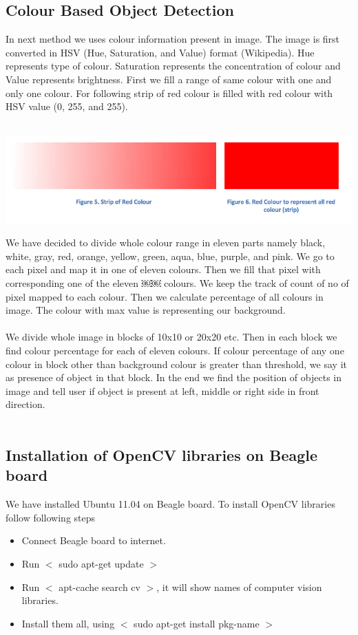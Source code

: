 \documentclass[12pt]{article}
\begin{document}
\subsection{Colour Based Object Detection}
In next method we uses colour information present in image. The image is first converted in HSV (Hue, Saturation, and Value) format (Wikipedia). Hue represents type of colour. Saturation represents the concentration of colour and Value represents brightness. First we fill a range of same colour with one and only one colour. For following strip of red colour is filled with red colour with HSV value (0, 255, and 255)\cite{hslhsv}.\\
\\
\begin{center} \includegraphics[scale=0.4]{a3} \end{center}
We have decided to divide whole colour range in eleven parts namely black, white, gray, red, orange, yellow, green, aqua, blue, purple, and pink. We go to each pixel and map it in one of eleven colours. Then we fill that pixel with corresponding one of the eleven
￼￼
colours. We keep the track of count of no of pixel mapped to each colour. Then we calculate percentage of all colours in image. The colour with max value is representing our background.\\
\\
We divide whole image in blocks of 10x10 or 20x20 etc. Then in each block we find colour percentage for each of eleven colours. If colour percentage of any one colour in block other than background colour is greater than threshold, we say it as presence of object in that block. In the end we find the position of objects in image and tell user if object is present at left, middle or right side in front direction.\\
\\
\subsection{Installation of OpenCV libraries on Beagle board}
We have installed Ubuntu 11.04 on Beagle board. To install OpenCV\cite{opencv} libraries follow following steps
\begin{itemize}
\item Connect Beagle board to internet.
\item Run $<$ sudo apt-get update $>$
\item Run $<$ apt-cache search cv $>$, it will show names of computer vision libraries.
\item Install them all, using $<$ sudo apt-get install pkg-name $>$
\end{itemize}
\end{document}
